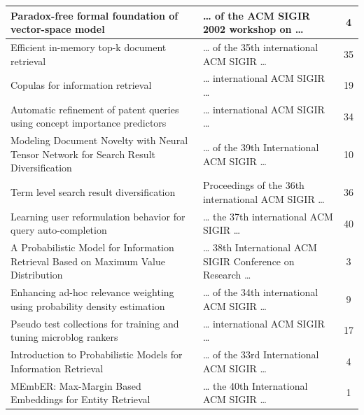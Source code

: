 \documentclass[letterpaper,12pt]{article}
\begin{document}
\begin{longtable}{|p{9cm}|p{5cm}|c|}
Paradox-free formal foundation of vector-space model & … of the ACM SIGIR 2002 workshop on … & 4  \\ \hline
Efficient in-memory top-k document retrieval & … of the 35th international ACM SIGIR … & 35  \\ \hline
Copulas for information retrieval & … international ACM SIGIR … & 19  \\ \hline
Automatic refinement of patent queries using concept importance predictors & … international ACM SIGIR … & 34  \\ \hline
Modeling Document Novelty with Neural Tensor Network for Search Result Diversification & … of the 39th International ACM SIGIR … & 10  \\ \hline
Term level search result diversification & Proceedings of the 36th international ACM SIGIR … & 36  \\ \hline
Learning user reformulation behavior for query auto-completion & … the 37th international ACM SIGIR … & 40  \\ \hline
A Probabilistic Model for Information Retrieval Based on Maximum Value Distribution & … 38th International ACM SIGIR Conference on Research … & 3  \\ \hline
Enhancing ad-hoc relevance weighting using probability density estimation & … of the 34th international ACM SIGIR … & 9  \\ \hline
Pseudo test collections for training and tuning microblog rankers & … international ACM SIGIR … & 17  \\ \hline
Introduction to Probabilistic Models for Information Retrieval & … of the 33rd International ACM SIGIR … & 4  \\ \hline
MEmbER: Max-Margin Based Embeddings for Entity Retrieval & … the 40th International ACM SIGIR … & 1  \\ \hline
\hline
\end{longtable}
\end{document}

